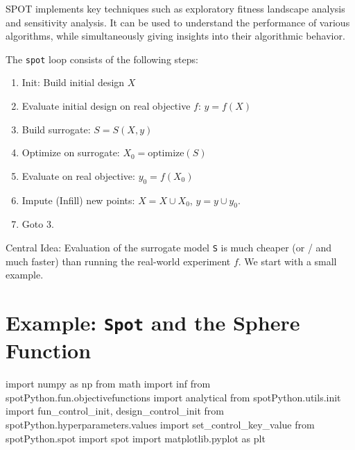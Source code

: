 \documentclass[
  letterpaper,
  DIV=11,
  numbers=noendperiod]{scrreprt}
\newenvironment{Shaded}{\begin{snugshade}}{\end{snugshade}}
\newcommand{\ImportTok}[1]{\textcolor[rgb]{0.00,0.46,0.62}{#1}}
\newcommand{\NormalTok}[1]{\textcolor[rgb]{0.00,0.23,0.31}{#1}}
\providecommand{\tightlist}{%
  \setlength{\itemsep}{0pt}\setlength{\parskip}{0pt}}\usepackage{longtable,booktabs,array}
\begin{document}
SPOT implements key techniques such as exploratory fitness landscape
analysis and sensitivity analysis. It can be used to understand the
performance of various algorithms, while simultaneously giving insights
into their algorithmic behavior.

The \texttt{spot} loop consists of the following steps:

\begin{enumerate}
\def\labelenumi{\arabic{enumi}.}
\tightlist
\item
  Init: Build initial design \(X\)
\item
  Evaluate initial design on real objective \(f\): \(y = f(X)\)
\item
  Build surrogate: \(S = S(X,y)\)
\item
  Optimize on surrogate: \(X_0 =  \text{optimize}(S)\)
\item
  Evaluate on real objective: \(y_0 = f(X_0)\)
\item
  Impute (Infill) new points: \(X = X \cup X_0\), \(y = y \cup y_0\).
\item
  Goto 3.
\end{enumerate}

Central Idea: Evaluation of the surrogate model \texttt{S} is much
cheaper (or / and much faster) than running the real-world experiment
\(f\). We start with a small example.

\section{\texorpdfstring{Example: \texttt{Spot} and the Sphere
Function}{Example: Spot and the Sphere Function}}\label{example-spot-and-the-sphere-function}

\begin{Shaded}
\begin{Highlighting}[]
\ImportTok{import}\NormalTok{ numpy }\ImportTok{as}\NormalTok{ np}
\ImportTok{from}\NormalTok{ math }\ImportTok{import}\NormalTok{ inf}
\ImportTok{from}\NormalTok{ spotPython.fun.objectivefunctions }\ImportTok{import}\NormalTok{ analytical}
\ImportTok{from}\NormalTok{ spotPython.utils.init }\ImportTok{import}\NormalTok{ fun\_control\_init, design\_control\_init}
\ImportTok{from}\NormalTok{ spotPython.hyperparameters.values }\ImportTok{import}\NormalTok{ set\_control\_key\_value}
\ImportTok{from}\NormalTok{ spotPython.spot }\ImportTok{import}\NormalTok{ spot}
\ImportTok{import}\NormalTok{ matplotlib.pyplot }\ImportTok{as}\NormalTok{ plt}
\end{Highlighting}
\end{Shaded}
\end{document}
